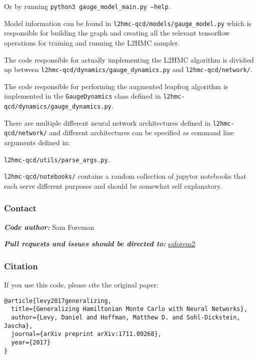 \vspace{5pt}
\noindent
Or by running \texttt{python3 gauge\_model\_main.py --help}.
%

\vspace{10pt}
\noindent
Model information can be found in
\texttt{l2hmc-qcd/models/gauge\_model.py} which is responsible for
building the graph and creating all the relevant tensorflow operations
for training and running the L2HMC sampler.

\vspace{10pt}
\noindent
The code responsible for actually implementing the L2HMC algorithm is
dividied up between \texttt{l2hmc-qcd/dynamics/gauge\_dynamics.py} and
\texttt{l2hmc-qcd/network/}.

\vspace{10pt}
\noindent
The code responsible for performing the augmented leapfrog algorithm is
implemented in the \texttt{GaugeDynamics} class defined in
\texttt{l2hmc-qcd/dynamics/gauge\_dynamics.py}.

\vspace{10pt}
\noindent
There are multiple different neural network architectures defined in
\texttt{l2hmc-qcd/network/} and different architectures can be specified
as command line arguments defined in:

\texttt{l2hmc-qcd/utils/parse\_args.py}.

\vspace{10pt}
\noindent
\texttt{l2hmc-qcd/notebooks/} contains a random collection of jupyter
notebooks that each serve different purposes and should be somewhat self
explanatory.

\hypertarget{contact}{%
\subsubsection{Contact}\label{contact}}

\textbf{\emph{Code author:}} Sam Foreman

\noindent
\textbf{\emph{Pull requests and issues should be directed to:}}
\href{http://github.com/saforem2}{saforem2}

\hypertarget{citation}{%
\subsubsection{Citation}\label{citation}}

If you use this code, please cite the original paper:

\begin{verbatim}
@article{levy2017generalizing,
  title={Generalizing Hamiltonian Monte Carlo with Neural Networks},
  author={Levy, Daniel and Hoffman, Matthew D. and Sohl-Dickstein, Jascha},
  journal={arXiv preprint arXiv:1711.09268},
  year={2017}
}
\end{verbatim}
